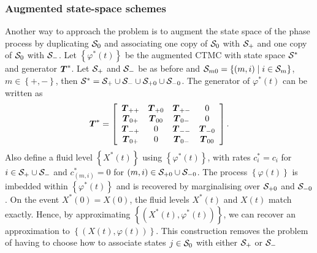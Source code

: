 \subsubsection{Augmented state-space schemes}\label{subsec: augmented }
Another way to approach the problem is to augment the state space of the phase process by duplicating \(\mathcal{S}_0\) and associating one copy of \(\mathcal{S}_0\) with \(\mathcal{S}_+\) and one copy of \(\mathcal{S}_0\) with \(\mathcal{S}_-\). Let \(\left\{\varphi^*(t)\right\}\) be the augmented CTMC with state space \(\mathcal{S}^*\) and generator \(\boldsymbol{T}^*\). Let \(\mathcal{S}_+\) and \(\mathcal{S}_-\) be as before and \(\mathcal{S}_{m0} = \left\{(m,i)\mid i\in\mathcal{S}_m\right\}\), \(m\in\left\{+,-\right\}\), then \(\mathcal{S}^* = \mathcal{S}_+\cup\mathcal{S}_-\cup\mathcal{S}_{+0}\cup\mathcal{S}_{-0}\). 
The generator of \(\varphi^*(t)\) can be written as 
\[\boldsymbol{T}^* = \left[\begin{array}{cccc} \boldsymbol{T}_{++} & \boldsymbol{T}_{+0} & \boldsymbol{T}_{+-} & 0 \\ \boldsymbol{T}_{0+} & \boldsymbol{T}_{00} & \boldsymbol{T}_{0-} & 0 \\ \boldsymbol{T}_{-+} & 0 & \boldsymbol{T}_{--} & \boldsymbol{T}_{-0} \\  \boldsymbol{T}_{0+} & 0 & \boldsymbol{T}_{0-} & \boldsymbol{T}_{00} \end{array}\right]. \]
Also define a fluid level \(\left\{X^*(t)\right\}\) using \(\left\{\varphi^*(t)\right\}\), with rates \(c_i^*=c_i\) for \(i\in\mathcal{S}_+\cup\mathcal{S}_-\) and \(c_{(m,i)}^* = 0\) for \((m,i)\in\mathcal{S}_{+0}\cup\mathcal{S}_{-0}\). The process \(\left\{\varphi(t)\right\}\) is imbedded within \(\left\{\varphi^*(t)\right\}\) and is recovered by marginalising over \(\mathcal{S}_{+0}\) and \(\mathcal{S}_{-0}\). On the event \(X^*(0)=X(0)\), the fluid levels \(X^*(t)\) and \(X(t)\) match exactly. Hence, by approximating \(\left\{(X^*(t),\varphi^*(t))\right\}\), we can recover an approximation to \(\left\{(X(t),\varphi(t))\right\}\). This construction removes the problem of having to choose how to associate states \(j\in\mathcal{S}_0\) with either \(\mathcal{S}_+\) or \(\mathcal{S}_-\)

